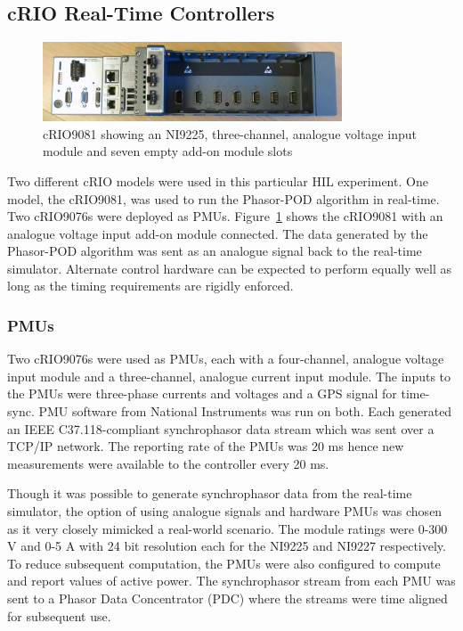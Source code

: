 \documentclass[conference]{IEEEtran}
\begin{document}
\subsection{cRIO Real-Time Controllers}
\begin{figure}[H]
\centering
\includegraphics[width=3.5in]{DSC05446.JPG}
\vspace{-0.5em}
\caption{cRIO9081 showing an NI9225, three-channel, analogue voltage input module and seven empty add-on module slots}
\label{cRIO}
\end{figure}
Two different cRIO models were used in this particular HIL experiment. One model, the cRIO9081, was used to run the Phasor-POD algorithm in real-time. Two cRIO9076s were deployed as PMUs. Figure~\ref{cRIO} shows the cRIO9081 with an analogue voltage input add-on module connected. The data generated by the Phasor-POD algorithm was sent as an analogue signal back to the real-time simulator. Alternate control hardware can be expected to perform equally well as long as the timing requirements are rigidly enforced.

\subsubsection*{PMUs} Two cRIO9076s were used as PMUs, each with a four-channel, analogue voltage input module and a three-channel, analogue current input module. The inputs to the PMUs were three-phase currents and voltages and a GPS signal for time-sync. PMU software from National Instruments was run on both. Each generated an IEEE C37.118-compliant synchrophasor data stream which was sent over a TCP/IP network. The reporting rate of the PMUs was 20 ms hence new measurements were available to the controller every 20 ms. 

Though it was possible to generate synchrophasor data from the real-time simulator, the option of using analogue signals and hardware PMUs was chosen as it very closely mimicked a real-world scenario. The module ratings were 0-300 V and 0-5 A with 24 bit resolution each\cite{cRIO9081} for the NI9225 and NI9227 respectively. To reduce subsequent computation, the PMUs were also configured to compute and report values of active power. The synchrophasor stream from each PMU was sent to a Phasor Data Concentrator (PDC)\cite{SEL} where the streams were time aligned for subsequent use.
\end{document}

